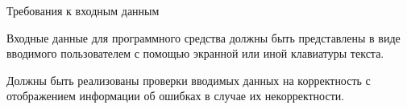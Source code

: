 \subsubsection{} Требования к входным данным
\label{sec:analysis:research:req:inputs}

Входные данные для программного средства должны быть представлены в виде вводимого пользователем с помощью экранной или иной клавиатуры текста.

Должны быть реализованы проверки вводимых данных на корректность с отображением информации об ошибках в случае их некорректности.